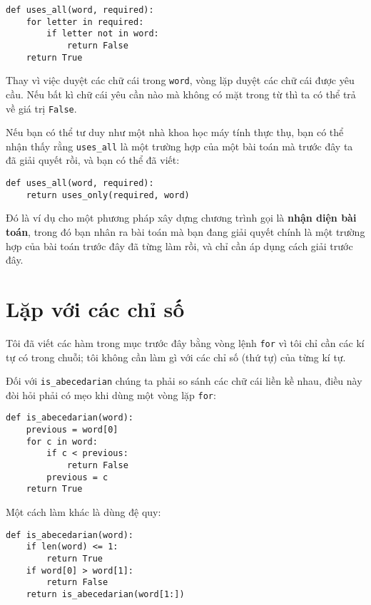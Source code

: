 \documentclass[11pt]{book}
\begin{document}
\beforeverb
\begin{verbatim}
def uses_all(word, required):
    for letter in required: 
        if letter not in word:
            return False
    return True
\end{verbatim}
\afterverb
%
Thay vì việc duyệt các chữ cái trong {\tt word}, vòng lặp duyệt các chữ cái
được yêu cầu. Nếu bất kì chữ cái yêu cần nào mà không có mặt trong từ thì ta
có thể trả về giá trị  {\tt False}.


Nếu bạn có thể tư duy như một nhà khoa học máy tính thực thụ, bạn có thể 
nhận thấy rằng \verb"uses_all" là một trường hợp của một bài toán mà trước
đây ta đã giải quyết rồi, và bạn có thể đã viết:

\beforeverb
\begin{verbatim}
def uses_all(word, required):
    return uses_only(required, word)
\end{verbatim}
\afterverb
%
Đó là ví dụ cho một phương pháp xây dựng chương trình gọi là {\bf nhận diện
bài toán}, trong đó bạn nhân ra bài toán mà bạn đang giải quyết chính là một
trường hợp của bài toán trước đây đã từng làm rồi, và chỉ cần áp dụng cách
giải trước đây.



\section{Lặp với các chỉ số}


Tôi đã viết các hàm trong mục trước đây bằng vòng lệnh {\tt for}
vì tôi chỉ cần các kí tự có trong chuỗi; tôi không cần làm gì với các chỉ số
(thứ tự) của từng kí tự.

Đối với \verb"is_abecedarian" chúng ta phải so sánh các chữ cái liền kề nhau,
điều này đòi hỏi phải có mẹo khi dùng một vòng lặp {\tt for}:

\beforeverb
\begin{verbatim}
def is_abecedarian(word):
    previous = word[0]
    for c in word:
        if c < previous:
            return False
        previous = c
    return True
\end{verbatim}
\afterverb

Một cách làm  khác là dùng đệ quy:

\beforeverb
\begin{verbatim}
def is_abecedarian(word):
    if len(word) <= 1:
        return True
    if word[0] > word[1]:
        return False
    return is_abecedarian(word[1:])
\end{verbatim}
\afterverb
\end{document}
